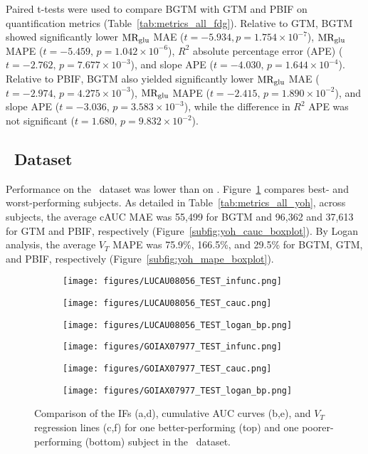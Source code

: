 Paired t-tests were used to compare BGTM with GTM and PBIF on quantification metrics (Table~\ref{tab:metrics_all_fdg}).
Relative to GTM, BGTM showed significantly lower \(\text{MR}_{\text{glu}}\) MAE (\(t=-5.934, p=1.754\times 10^{-7}\)), \(\text{MR}_{\text{glu}}\) MAPE (\(t=-5.459,\,p=1.042\times 10^{-6}\)), \(R^2\) absolute percentage error (APE) (\(t=-2.762,\,p=7.677\times 10^{-3}\)), and slope APE (\(t=-4.030,\,p=1.644\times 10^{-4}\)).
Relative to PBIF, BGTM also yielded significantly lower \(\text{MR}_{\text{glu}}\) MAE (\(t=-2.974,\,p=4.275\times 10^{-3}\)), \(\text{MR}_{\text{glu}}\) MAPE (\(t=-2.415,\,p=1.890\times 10^{-2}\)), and slope APE (\(t=-3.036,\,p=3.583\times 10^{-3}\)), while the difference in \(R^2\) APE was not significant (\(t=1.680,\,p=9.832\times 10^{-2}\)).

\subsection{\yohimbine\ Dataset}
Performance on the \yohimbine\ dataset was lower than on \fdg.
Figure~\ref{fig:yoh_ifs} compares best- and worst-performing subjects.
As detailed in Table~\ref{tab:metrics_all_yoh}, across subjects, the average cAUC MAE was 55{,}499 for BGTM and 96{,}362 and 37{,}613 for GTM and PBIF, respectively (Figure~\ref{subfig:yoh_cauc_boxplot}).
By Logan analysis, the average \(V_T\) MAPE was 75.9\%, 166.5\%, and 29.5\% for BGTM, GTM, and PBIF, respectively (Figure~\ref{subfig:yoh_mape_boxplot}).

\begin{figure}[h]
	\centering
	\begin{subfigure}[b]{0.322\textwidth}
		\texttt{[image: figures/LUCAU08056\_TEST\_infunc.png]}
		\caption{}
	\end{subfigure}
	\begin{subfigure}[b]{0.322\textwidth}
		\texttt{[image: figures/LUCAU08056\_TEST\_cauc.png]}
		\caption{}
	\end{subfigure}
	\begin{subfigure}[b]{0.322\textwidth}
		\texttt{[image: figures/LUCAU08056\_TEST\_logan\_bp.png]}
		\caption{}
	\end{subfigure}
	\begin{subfigure}[b]{0.322\textwidth}
		\texttt{[image: figures/GOIAX07977\_TEST\_infunc.png]}
		\caption{}
	\end{subfigure}
	\begin{subfigure}[b]{0.322\textwidth}
		\texttt{[image: figures/GOIAX07977\_TEST\_cauc.png]}
		\caption{}
	\end{subfigure}
	\begin{subfigure}[b]{0.322\textwidth}
		\texttt{[image: figures/GOIAX07977\_TEST\_logan\_bp.png]}
		\caption{}
	\end{subfigure}
	\caption{Comparison of the IFs (a,d), cumulative AUC curves (b,e), and \(V_T\) regression lines (c,f) for one better-performing (top) and one poorer-performing (bottom) subject in the \yohimbine\ dataset.}
	\label{fig:yoh_ifs}
\end{figure}

